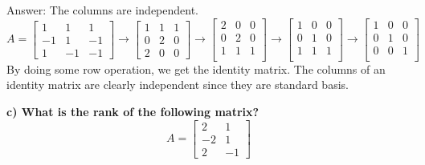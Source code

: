 \documentclass[paper=a4, fontsize=11pt]{scrartcl} %
\numberwithin{equation}{section} %
\numberwithin{figure}{section} %
\numberwithin{table}{section} %
\begin{document}
Answer: The columns are independent.
$$
A = 
\begin{bmatrix}
1 & 1 & 1 \\
-1 & 1 & -1 \\
1 & -1 & -1 
\end{bmatrix}
\rightarrow
\begin{bmatrix}
1 & 1 & 1 \\
0 & 2 & 0 \\
2 & 0 & 0 
\end{bmatrix}
\rightarrow
\begin{bmatrix}
2 & 0 & 0 \\
0 & 2 & 0 \\
1 & 1 & 1 \\
\end{bmatrix}
\rightarrow
\begin{bmatrix}
1 & 0 & 0 \\
0 & 1 & 0 \\
1 & 1 & 1 \\
\end{bmatrix}
\rightarrow
\begin{bmatrix}
1 & 0 & 0 \\
0 & 1 & 0 \\
0 & 0 & 1 \\
\end{bmatrix}
$$
By doing some row operation, we get the identity matrix. The columns of an identity matrix are clearly independent since they are standard basis. 


\newpage
\textbf{c) What is the rank of the following matrix?} 
$$
A = 
\begin{bmatrix}
2 & 1 \\
-2 & 1 \\
2 & -1 
\end{bmatrix}
$$
\end{document}
